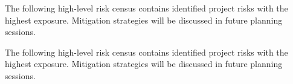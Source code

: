 
The following high-level risk census contains identified project risks with the highest exposure. Mitigation strategies will be discussed in future planning sessions.

The following high-level risk census contains identified project risks with the highest exposure. Mitigation strategies will be discussed in future planning sessions.

\begin{table}[h]
\caption{Overview of highest exposure project risks} 
\end{table}